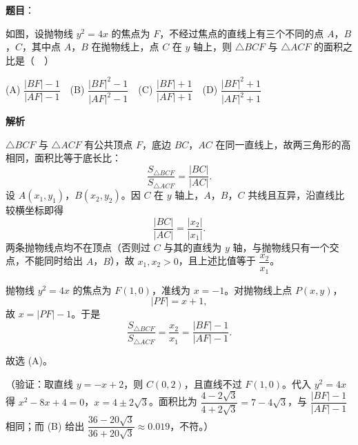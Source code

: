 \begin{answer}

\textbf{题目}：

如图，设抛物线 \(y^2=4x\) 的焦点为 \(F\)，不经过焦点的直线上有三个不同的点 \(A\)，\(B\)，\(C\)，其中点 \(A\)，\(B\) 在抛物线上，点 \(C\) 在 \(y\) 轴上，则 \(\triangle BCF\) 与 \(\triangle ACF\) 的面积之比是（　）
\nopagebreak[4]
\begin{center}\end{center}
\nopagebreak[4]
(A) \(\dfrac{|BF|-1}{|AF|-1}\)　(B) \(\dfrac{|BF|^2-1}{|AF|^2-1}\)　(C) \(\dfrac{|BF|+1}{|AF|+1}\)　(D) \(\dfrac{|BF|^2+1}{|AF|^2+1}\)

\textbf{解析}

\(\triangle BCF\) 与 \(\triangle ACF\) 有公共顶点 \(F\)，底边 \(BC\)，\(AC\) 在同一直线上，故两三角形的高相同，面积比等于底长比：
\nopagebreak[4]
\[
\frac{S_{\triangle BCF}}{S_{\triangle ACF}}=\frac{|BC|}{|AC|}.
\]
设 \(A(x_1,y_1)\)，\(B(x_2,y_2)\)。因 \(C\) 在 \(y\) 轴上，\(A\)，\(B\)，\(C\) 共线且互异，沿直线比较横坐标即得
\nopagebreak[4]
\[
\frac{|BC|}{|AC|}=\frac{|x_2|}{|x_1|}.
\]
两条抛物线点均不在顶点（否则过 \(C\) 与其的直线为 \(y\) 轴，与抛物线只有一个交点，不能同时给出 \(A\)，\(B\)），故 \(x_1,x_2>0\)，且上述比值等于 \(\dfrac{x_2}{x_1}\)。

抛物线 \(y^2=4x\) 的焦点为 \(F(1,0)\)，准线为 \(x=-1\)。对抛物线上点 \(P(x,y)\)，
\nopagebreak[4]
\[
|PF|=x+1,
\]
故 \(x=|PF|-1\)。于是
\nopagebreak[4]
\[
\frac{S_{\triangle BCF}}{S_{\triangle ACF}}=\frac{x_2}{x_1}
=\frac{|BF|-1}{|AF|-1}.
\]

故选 (A)。

（验证：取直线 \(y=-x+2\)，则 \(C(0,2)\)，且直线不过 \(F(1,0)\)。代入 \(y^2=4x\) 得 \(x^2-8x+4=0\)，\(x=4\pm2\sqrt3\)。面积比为 \(\dfrac{4-2\sqrt3}{4+2\sqrt3}=7-4\sqrt3\)，与 \(\dfrac{|BF|-1}{|AF|-1}\) 相同；而 (B) 给出 \(\dfrac{36-20\sqrt3}{36+20\sqrt3}\approx0.019\)，不符。）


\end{answer}
